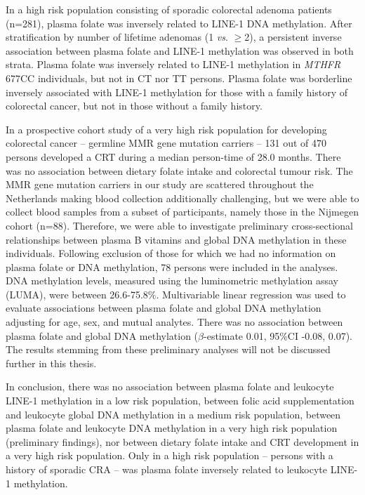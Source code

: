 \noindent In a high risk population consisting of sporadic colorectal adenoma patients (n=281), plasma folate was inversely related to LINE-1 DNA methylation. After stratification by number of lifetime adenomas (1 \emph{vs}. $\geq$2), a persistent inverse association between plasma folate and LINE-1 methylation was observed in both strata. Plasma folate was inversely related to LINE-1 methylation in \emph{MTHFR} 677CC individuals, but not in CT nor TT persons. Plasma folate was borderline inversely associated with LINE-1 methylation for those with a family history of colorectal cancer, but not in those without a family history.

\noindent In a prospective cohort study of a very high risk population for developing colorectal cancer -- germline MMR gene mutation carriers -- 131 out of 470 persons developed a CRT during a median person-time of 28.0 months. There was no association between dietary folate intake and colorectal tumour risk. The MMR gene mutation carriers in our study are scattered throughout the Netherlands making blood collection additionally challenging, but we were able to collect blood samples from a subset of participants, namely those in the Nijmegen cohort (n=88). Therefore, we were able to investigate preliminary cross-sectional relationships between plasma B vitamins and global DNA methylation in these individuals. Following exclusion of those for which we had no information on plasma folate or DNA methylation, 78 persons were included in the analyses. DNA methylation levels, measured using the luminometric methylation assay (LUMA), were between 26.6-75.8\%. Multivariable linear regression was used to evaluate associations between plasma folate and global DNA methylation adjusting for age, sex, and mutual analytes. There was no association between plasma folate and global DNA methylation ($\beta$-estimate 0.01, 95\%CI -0.08, 0.07). The results stemming from these preliminary analyses will not be discussed further in this thesis.

\noindent In conclusion, there was no association between plasma folate and leukocyte LINE-1 methylation in a low risk population, between folic acid supplementation and leukocyte global DNA methylation in a medium risk population, between plasma folate and leukocyte DNA methylation in a very high risk population (preliminary findings), nor between dietary folate intake and CRT development in a very high risk population. Only in a high risk population -- persons with a history of sporadic CRA -- was plasma folate inversely related to leukocyte LINE-1 methylation.

